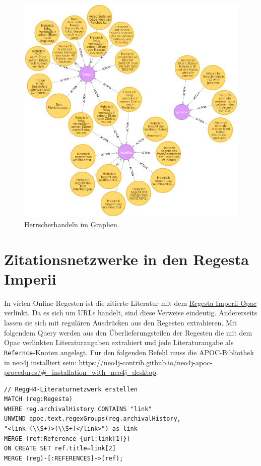 \documentclass[ngerman,]{scrreprt}
\begin{document}
\begin{figure}
\centering
\includegraphics{Bilder/RI2Graph/ReggH4-Action.png}
\caption{Herrscherhandeln im Graphen.}
\label{herrscherhandeln}
\end{figure}

\hypertarget{zitationsnetzwerke-in-den-regesta-imperii}{%
\section{Zitationsnetzwerke in den Regesta Imperii}\label{zitationsnetzwerke-in-den-regesta-imperii}}

In vielen Online-Regesten ist die zitierte Literatur mit dem \href{http://opac.regesta-imperii.de/lang_de/}{Regesta-Imperii-Opac} verlinkt. Da es sich um URLs handelt, sind diese Verweise eindeutig. Andererseits lassen sie sich mit regulären Ausdrücken aus den Regesten extrahieren. Mit folgendem Query werden aus den Überlieferungsteilen der Regesten die mit dem Opac verlinkten Literaturangaben extrahiert und jede Literaturangabe als \texttt{Refernce}-Knoten angelegt. Für den folgenden Befehl muss die APOC-Bibliothek in neo4j installiert sein: \url{https://neo4j-contrib.github.io/neo4j-apoc-procedures/#_installation_with_neo4j_desktop}.

\begin{verbatim}
// ReggH4-Literaturnetzwerk erstellen
MATCH (reg:Regesta)
WHERE reg.archivalHistory CONTAINS "link"
UNWIND apoc.text.regexGroups(reg.archivalHistory,
"<link (\\S+)>(\\S+)</link>") as link
MERGE (ref:Reference {url:link[1]})
ON CREATE SET ref.title=link[2]
MERGE (reg)-[:REFERENCES]->(ref);
\end{verbatim}
\end{document}

